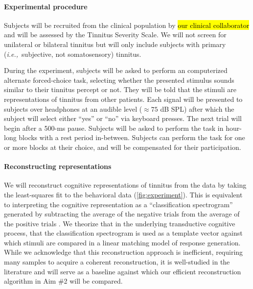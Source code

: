 \documentclass[11pt, notitlepage]{article} %
\def\ie{{\emph{i.e.,}}~}
\begin{document}
\paragraph{Experimental procedure}

Subjects will be recruited from the clinical population by \hl{our clinical collaborator}
and will be assessed by the Tinnitus Severity Scale.
We will not screen for unilateral or bilateral tinnitus but will only include subjects
with primary (\ie subjective, not somatosensory) tinnitus.

During the experiment, subjects will be asked to perform an computerized alternate forced-choice task,
selecting whether the presented stimulus sounds similar to their tinnitus percept or not.
They will be told that the stimuli are representations of tinnitus from other patients.
Each signal will be presented to subjects over headphones
at an audible level ($\approx 75$ dB SPL) after which
the subject will select either ``yes'' or ``no'' via keyboard presses.
The next trial will begin after a 500-ms pause.
Subjects will be asked to perform the task in hour-long blocks with a rest period in-between.
Subjects can perform the task for one or more blocks at their choice,
and will be compensated for their participation.

\paragraph{Reconstructing representations}

We will reconstruct cognitive representations of tinnitus from the data
by taking the least-squares fit to the behavioral data
(\autoref{fig:experiment}).
This is equivalent to interpreting the cognitive representation
as a ``classification spectrogram''
generated by subtracting the average of the negative trials from the average of the positive trials
\cite{gosselinSuperstitiousPerceptionsReveal2003}.
We theorize that in the underlying transductive cognitive process,
that the classification spectrogram is used as a template vector
against which stimuli are compared in a linear matching model of response generation.
While we acknowledge that this reconstruction approach is inefficient,
requiring many samples to acquire a coherent reconstruction,
it is well-studied in the literature
and will serve as a baseline against which our efficient reconstruction
algorithm in Aim \#2 will be compared.
\end{document}
